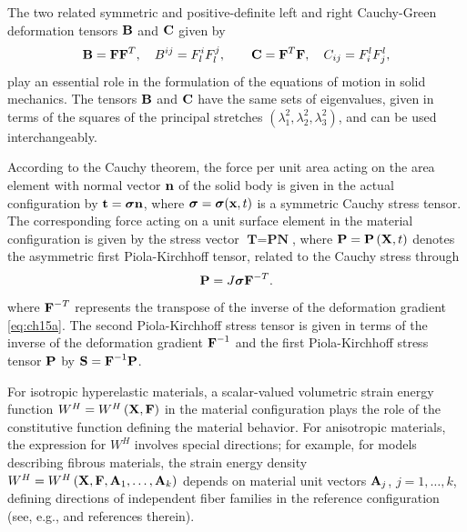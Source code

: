 \documentclass[11pt,letter,subeqn,fleqn]{article}
\numberwithin{equation}{section}
\numberwithin{table}{section}
\numberwithin{figure}{section}
\def\beq{\begin{equation}}
\def\eeq{\end{equation}}
\def\vec#1{{\boldsymbol{\rm #1}}} %
\def\tens#1{{\boldsymbol{\rm #1}}} %
\def\vec#1{{\boldsymbol{\rm #1}}} %
\def\tens#1{{\boldsymbol{\rm #1}}} %
\begin{document}
The two related symmetric and positive-definite left and right Cauchy-Green deformation tensors $\tens{B}$ and $\vec{C}$ given by
\beq\label{eq:BC}
\tens{B} = \tens{F}\tens{F}^T,\quad {B}^{ij}=F^{i}_{l}F^{j}_{l} ,\qquad \tens{C} = \tens{F}^T\tens{F}, \quad {C}_{ij}=F^{l}_{i}F^{l}_{j},
\eeq
play an essential role in the formulation of the equations of motion in solid mechanics. The tensors  $\tens{B}$ and $\tens{C}$ have the same sets of eigenvalues, given in terms of the squares of the principal stretches $\left(\lambda^{2}_{1},\lambda^{2}_{2},\lambda^{2}_{3}\right)$, and can be used interchangeably.

According to the Cauchy theorem, the force per unit area acting on the area element with normal vector $\vec{n}$ of the solid body is given in the actual configuration  by $\vec{t}=\tens{\sigma}\vec{n}$, where $\tens{\sigma}=\tens{\sigma} (\vec{x},t)$ is a symmetric Cauchy stress tensor. The corresponding force acting on a unit surface element in the material configuration is given by the stress vector $\textbf{T}=\textbf{P}\textbf{N}$, where $\vec{P}=\vec{P}\left(\vec{X}, t\right)$ denotes the asymmetric first Piola-Kirchhoff tensor, related to the Cauchy stress through
\begin{equation}\label{eq:ch123}
\vec{P}=J\boldsymbol{\sigma} \vec{F}^{-T}.
\end{equation}
where  $\vec{F}^{-T}$ represents the transpose of the inverse of the deformation gradient \eqref{eq:ch15a}. The second Piola-Kirchhoff stress tensor is given in terms of the inverse of the deformation gradient $\vec{F}^{-1}$ and the first Piola-Kirchhoff stress tensor $\vec{P}$ by $\tens{S}=\tens{F}^{-1}\tens{P}$.

For isotropic hyperelastic materials, a scalar-valued volumetric strain energy function $W^H= W^H\left({\bf X},{\bf F}\right)$ in the material configuration plays the role of the constitutive function defining the material behavior. For anisotropic materials, the expression for $W^H$ involves special directions; for example, for models describing fibrous materials, the strain energy density $W^H = W^H\left(\vec{X},{\bf F}, \vec{A}_1,\ldots,\vec{A}_k\right)$ depends on material unit vectors ${\vec{A}_j}$, $j=1,\ldots,k$, defining directions of independent fiber families in the reference configuration (see, e.g., \cite{cheviakov2016one} and references therein).
\end{document}
